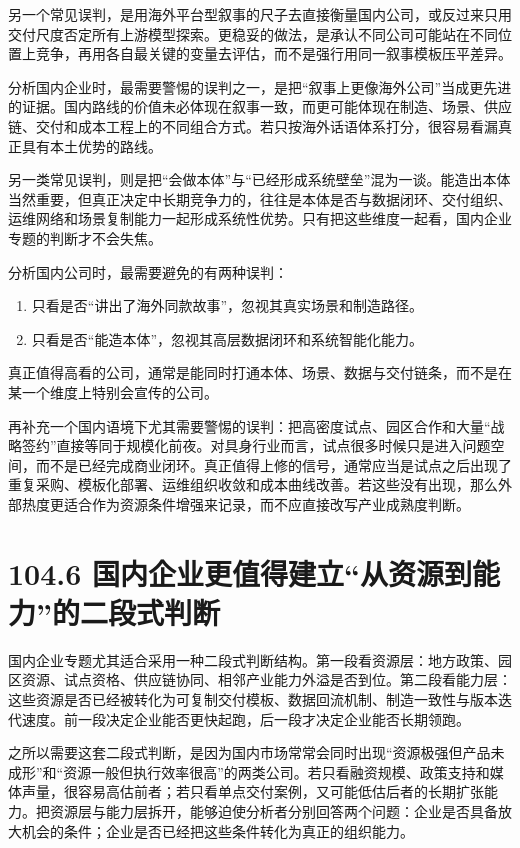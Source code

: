 另一个常见误判，是用海外平台型叙事的尺子去直接衡量国内公司，或反过来只用交付尺度否定所有上游模型探索。更稳妥的做法，是承认不同公司可能站在不同位置上竞争，再用各自最关键的变量去评估，而不是强行用同一叙事模板压平差异。

分析国内企业时，最需要警惕的误判之一，是把“叙事上更像海外公司”当成更先进的证据。国内路线的价值未必体现在叙事一致，而更可能体现在制造、场景、供应链、交付和成本工程上的不同组合方式。若只按海外话语体系打分，很容易看漏真正具有本土优势的路线。

另一类常见误判，则是把“会做本体”与“已经形成系统壁垒”混为一谈。能造出本体当然重要，但真正决定中长期竞争力的，往往是本体是否与数据闭环、交付组织、运维网络和场景复制能力一起形成系统性优势。只有把这些维度一起看，国内企业专题的判断才不会失焦。

分析国内公司时，最需要避免的有两种误判：

\begin{enumerate}
\item 只看是否“讲出了海外同款故事”，忽视其真实场景和制造路径。
\item 只看是否“能造本体”，忽视其高层数据闭环和系统智能化能力。
\end{enumerate}

真正值得高看的公司，通常是能同时打通本体、场景、数据与交付链条，而不是在某一个维度上特别会宣传的公司。

再补充一个国内语境下尤其需要警惕的误判：把高密度试点、园区合作和大量“战略签约”直接等同于规模化前夜。对具身行业而言，试点很多时候只是进入问题空间，而不是已经完成商业闭环。真正值得上修的信号，通常应当是试点之后出现了重复采购、模板化部署、运维组织收敛和成本曲线改善。若这些没有出现，那么外部热度更适合作为资源条件增强来记录，而不应直接改写产业成熟度判断。

\section*{104.6 国内企业更值得建立“从资源到能力”的二段式判断}


国内企业专题尤其适合采用一种二段式判断结构。第一段看资源层：地方政策、园区资源、试点资格、供应链协同、相邻产业能力外溢是否到位。第二段看能力层：这些资源是否已经被转化为可复制交付模板、数据回流机制、制造一致性与版本迭代速度。前一段决定企业能否更快起跑，后一段才决定企业能否长期领跑。

之所以需要这套二段式判断，是因为国内市场常常会同时出现“资源极强但产品未成形”和“资源一般但执行效率很高”的两类公司。若只看融资规模、政策支持和媒体声量，很容易高估前者；若只看单点交付案例，又可能低估后者的长期扩张能力。把资源层与能力层拆开，能够迫使分析者分别回答两个问题：企业是否具备放大机会的条件；企业是否已经把这些条件转化为真正的组织能力。

